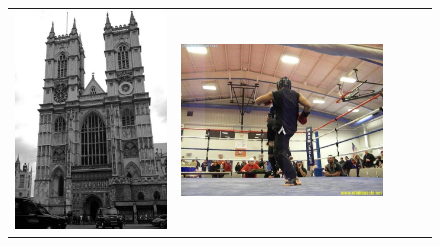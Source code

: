 \begin{figure}[!ht]
\begin{tabular}{c|cccc}
\includegraphics[height=\retrievalwidth\linewidth]{figures/applications/matching_horizon_group_2/00019725_jpg_0_0037706014462054725.jpg} &
\includegraphics[height=\retrievalwidth\linewidth]{figures/applications/matching_horizon_group_2/00005226_jpg_0_004158961011695579.jpg} \\

\end{tabular}
\end{figure}
